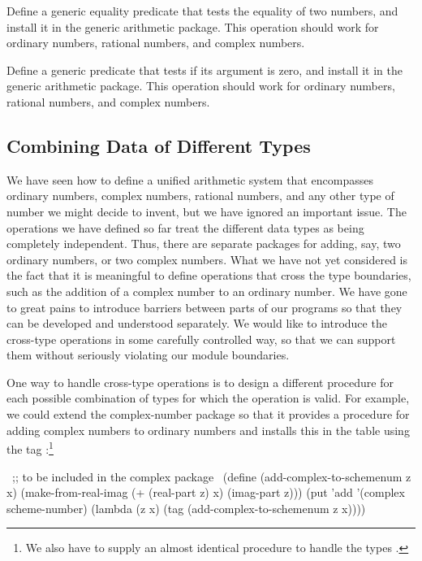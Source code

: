 \begin{exerciseGroup}
\label{Exercise 2.79}
 Define a generic equality
predicate  that tests the equality of two numbers, and install it in
the generic arithmetic package.  This operation should work for ordinary
numbers, rational numbers, and complex numbers.

\label{Exercise 2.80}
 Define a generic predicate
 that tests if its argument is zero, and install it in the generic
arithmetic package.  This operation should work for ordinary numbers, rational
numbers, and complex numbers.
\end{exerciseGroup}

\subsection{Combining Data of Different Types}
\label{Section 2.5.2}

We have seen how to define a unified arithmetic system that encompasses
ordinary numbers, complex numbers, rational numbers, and any other type of
number we might decide to invent, but we have ignored an important issue.  The
operations we have defined so far treat the different data types as being
completely independent.  Thus, there are separate packages for adding, say, two
ordinary numbers, or two complex numbers.  What we have not yet considered is
the fact that it is meaningful to define operations that cross the type
boundaries, such as the addition of a complex number to an ordinary number.  We
have gone to great pains to introduce barriers between parts of our programs so
that they can be developed and understood separately.  We would like to
introduce the cross-type operations in some carefully controlled way, so that
we can support them without seriously violating our module boundaries.

One way to handle cross-type operations is to design a different procedure for
each possible combination of types for which the operation is valid.  For
example, we could extend the complex-number package so that it provides a
procedure for adding complex numbers to ordinary numbers and installs this in
the table using the tag :\footnote{We also have
to supply an almost identical procedure to handle the types
.}

\begin{codeBlock}
~\textrm{;; to be included in the complex package}~
(define (add-complex-to-schemenum z x)
  (make-from-real-imag (+ (real-part z) x)
                       (imag-part z)))
(put 'add '(complex scheme-number)
     (lambda (z x)
       (tag (add-complex-to-schemenum z x))))
\end{codeBlock}

